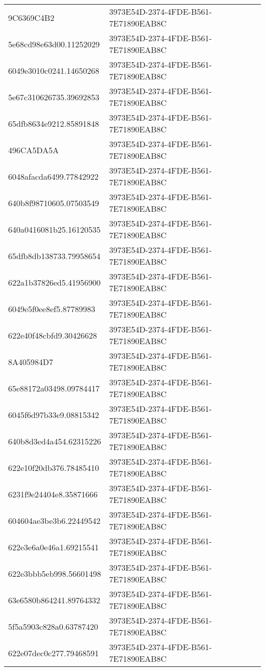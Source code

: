 \begin{tabular}{ll}
9C6369C4B2 & 3973E54D-2374-4FDE-B561-7E71890EAB8C \\
5e68cd98e63d00.11252029 & 3973E54D-2374-4FDE-B561-7E71890EAB8C \\
6049e3010c0241.14650268 & 3973E54D-2374-4FDE-B561-7E71890EAB8C \\
5e67c310626735.39692853 & 3973E54D-2374-4FDE-B561-7E71890EAB8C \\
65dfb8634e9212.85891848 & 3973E54D-2374-4FDE-B561-7E71890EAB8C \\
496CA5DA5A & 3973E54D-2374-4FDE-B561-7E71890EAB8C \\
6048afacda6499.77842922 & 3973E54D-2374-4FDE-B561-7E71890EAB8C \\
640b8f98710605.07503549 & 3973E54D-2374-4FDE-B561-7E71890EAB8C \\
640a0416081b25.16120535 & 3973E54D-2374-4FDE-B561-7E71890EAB8C \\
65dfb8db138733.79958654 & 3973E54D-2374-4FDE-B561-7E71890EAB8C \\
622a1b37826ed5.41956900 & 3973E54D-2374-4FDE-B561-7E71890EAB8C \\
6049e5f0ee8ef5.87789983 & 3973E54D-2374-4FDE-B561-7E71890EAB8C \\
622e40f48cbfd9.30426628 & 3973E54D-2374-4FDE-B561-7E71890EAB8C \\
8A405984D7 & 3973E54D-2374-4FDE-B561-7E71890EAB8C \\
65e88172a03498.09784417 & 3973E54D-2374-4FDE-B561-7E71890EAB8C \\
6045f6d97b33e9.08815342 & 3973E54D-2374-4FDE-B561-7E71890EAB8C \\
640b8d3ed4a454.62315226 & 3973E54D-2374-4FDE-B561-7E71890EAB8C \\
622e10f20db376.78485410 & 3973E54D-2374-4FDE-B561-7E71890EAB8C \\
6231f9e24404e8.35871666 & 3973E54D-2374-4FDE-B561-7E71890EAB8C \\
604604ae3be3b6.22449542 & 3973E54D-2374-4FDE-B561-7E71890EAB8C \\
622e3e6a0e46a1.69215541 & 3973E54D-2374-4FDE-B561-7E71890EAB8C \\
622e3bbb5eb998.56601498 & 3973E54D-2374-4FDE-B561-7E71890EAB8C \\
63e6580b864241.89764332 & 3973E54D-2374-4FDE-B561-7E71890EAB8C \\
5f5a5903c828a0.63787420 & 3973E54D-2374-4FDE-B561-7E71890EAB8C \\
622e07dec0c277.79468591 & 3973E54D-2374-4FDE-B561-7E71890EAB8C \\

\end{tabular}
